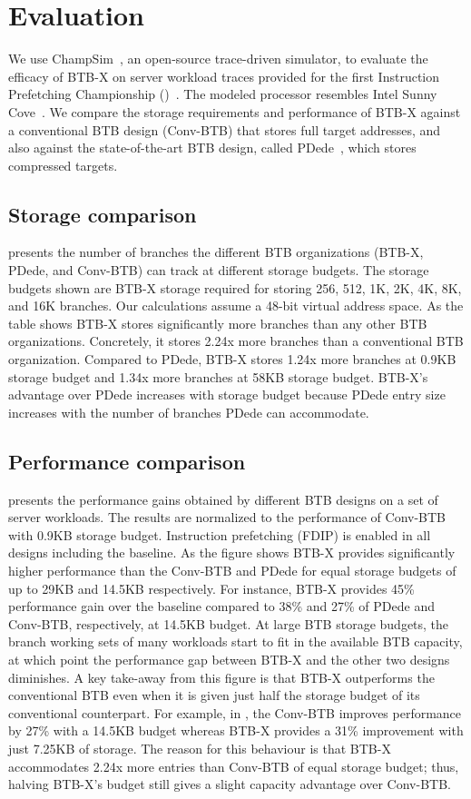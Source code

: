 \section{Evaluation}

We use ChampSim~\cite{champsim}, an open-source trace-driven simulator, to evaluate the efficacy of BTB-X on server workload traces provided for the first Instruction Prefetching Championship ()~\cite{ipc1}. The modeled processor resembles Intel Sunny Cove~\cite{sunnycove}. We compare the storage requirements and performance of BTB-X against a conventional BTB design (Conv-BTB) that stores full target addresses, and also against the state-of-the-art BTB design, called PDede~\cite{pdede}, which stores compressed targets.

\subsection{Storage comparison}
 presents the number of branches the different BTB organizations (BTB-X, PDede, and Conv-BTB) can track at different storage budgets. The storage budgets shown are BTB-X storage required for storing 256, 512, 1K, 2K, 4K, 8K, and 16K branches. Our calculations assume a 48-bit virtual address space. As the table shows BTB-X stores significantly more branches than any other BTB organizations. Concretely, it stores 2.24x more branches than a conventional BTB organization. Compared to PDede, BTB-X stores 1.24x more branches at 0.9KB storage budget and 1.34x more branches at 58KB storage budget. BTB-X's advantage over PDede increases with storage budget because PDede entry size increases with the number of branches PDede can accommodate. 

\subsection{Performance comparison}
 presents the performance gains obtained by different BTB designs on a set of server workloads. The results are normalized to the performance of Conv-BTB with 0.9KB storage budget. Instruction prefetching (FDIP) is enabled in all designs including the baseline. As the figure shows BTB-X provides significantly higher performance than the Conv-BTB and PDede for equal storage budgets of up to 29KB and 14.5KB respectively. For instance, BTB-X provides 45\% performance gain over the baseline compared to 38\% and 27\% of PDede and Conv-BTB, respectively, at 14.5KB budget. At large BTB storage budgets, the branch working sets of many workloads start to fit in the available BTB capacity, at which point the performance gap between BTB-X and the other two designs diminishes. A key take-away from this figure is that BTB-X outperforms the conventional BTB even when it is given just half the storage budget of its conventional counterpart. For example, in , the Conv-BTB improves performance by 27\% with a 14.5KB budget whereas BTB-X provides a 31\% improvement with just 7.25KB of storage. The reason for this behaviour is that BTB-X accommodates 2.24x more entries than Conv-BTB of equal storage budget; thus, halving BTB-X's budget still gives a slight capacity advantage over Conv-BTB.

